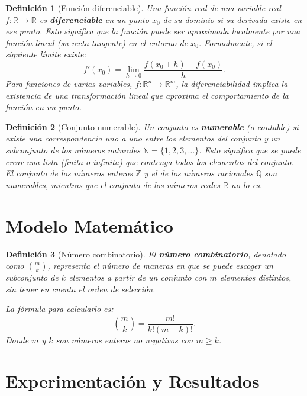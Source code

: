 \documentclass[12pt,a4paper]{book}
\newtheorem{defi}{Definición}[section]
\begin{document}
\begin{defi}[Función diferenciable]
    \label{def:fun_diferenciable}
Una función real de una variable real $f: \mathbb{R} \to \mathbb{R}$ es \textbf{diferenciable} en un punto $x_0$ de su dominio si su derivada existe en ese punto. Esto significa que la función puede ser aproximada localmente por una función lineal (su recta tangente) en el entorno de $x_0$. Formalmente, si el siguiente límite existe:
$$ f'(x_0) = \lim_{h \to 0} \frac{f(x_0+h) - f(x_0)}{h} .$$
Para funciones de varias variables, $f: \mathbb{R}^n \to \mathbb{R}^m$, la diferenciabilidad implica la existencia de una transformación lineal  que aproxima el comportamiento de la función en un punto.
\end{defi}

\begin{defi}[Conjunto numerable]
\label{def:conjunto_numerable}
Un conjunto es \textbf{numerable} (o contable) si existe una correspondencia uno a uno entre los elementos del conjunto y un subconjunto de los números naturales $\mathbb{N} = \{1, 2, 3, \dots\}$. Esto significa que se puede crear una lista (finita o infinita) que contenga todos los elementos del conjunto. El conjunto de los números enteros $\mathbb{Z}$ y el de los números racionales $\mathbb{Q}$ son numerables, mientras que el conjunto de los números reales $\mathbb{R}$ no lo es.
\end{defi}

\section{Modelo Matemático}

\begin{defi}[Número combinatorio]
\label{def:combinatorio}
El \textbf{número combinatorio}, denotado como $\binom{m}{k}$, representa el número de maneras en que se puede escoger un subconjunto de $k$ elementos a partir de un conjunto con $m$ elementos distintos, sin tener en cuenta el orden de selección.

La fórmula para calcularlo es:
$$ \binom{m}{k} = \frac{m!}{k!(m-k)!}.$$
Donde $m$ y $k$ son números enteros no negativos con $m \ge k$.
\end{defi}

\section{Experimentación y Resultados}
\end{document}
